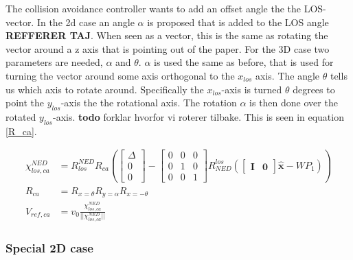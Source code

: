 The collision avoidance controller wants to add an offset angle the the LOS-vector. In the 2d case an angle $\alpha$ is proposed that is added to the LOS angle \textbf{REFFERER TAJ}. When seen as a vector, this is the same as rotating the vector around a z axis that is pointing out of the paper. For the 3D case two parameters are needed, $\alpha$ and $\theta$. $\alpha$ is used the same as before, that is used for turning the vector around some axis orthogonal to the $x_{los}$ axis. The angle $\theta$ tells us which axis to rotate around. Specifically the $x_{los}$-axis is turned $\theta$ degrees to point the $y_{los}$-axis the the rotational axis. The rotation $\alpha$ is then done over the rotated $y_{los}$-axis. \textbf{todo} forklar hvorfor vi roterer tilbake. This is seen in equation \ref{R_ca}.

\begin{align}
    \chi^{NED}_{los,ca} & = R^{NED}_{los}  R_{ca} \left(  \begin{bmatrix}\Delta \\ 0 \\ 0\end{bmatrix} - \begin{bmatrix} 0 & 0 & 0 \\ 0 & 1 & 0 \\ 0 & 0 & 1 \end{bmatrix} R^{los}_{NED} (\begin{bmatrix} \mathbf{I} & \mathbf{0} \end{bmatrix} \hat{\textbf{x}} - WP_1) \right) \label{chi^los_los,ca}\\
    R_{ca} & = R_{x=\theta} R_{y=\alpha} R_{x=-\theta} \label{R_ca} \\ 
    V_{ref,ca} & = v_0 \frac{\chi^{NED}_{los,ca} }{|| \chi^{NED}_{los,ca} ||} \label{V_ref,ca}
\end{align}


\subsubsection*{Special 2D case}

